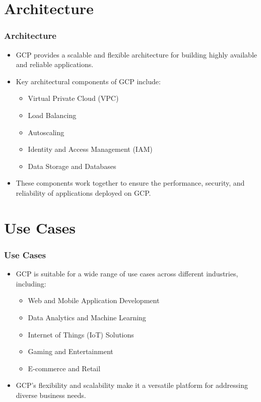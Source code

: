 \section{Architecture}

\begin{frame}[fragile]\frametitle{Architecture}
  \begin{itemize}
    \item GCP provides a scalable and flexible architecture for building highly available and reliable applications.
    \item Key architectural components of GCP include:
      \begin{itemize}
        \item Virtual Private Cloud (VPC)
        \item Load Balancing
        \item Autoscaling
        \item Identity and Access Management (IAM)
        \item Data Storage and Databases
      \end{itemize}
    \item These components work together to ensure the performance, security, and reliability of applications deployed on GCP.
  \end{itemize}
\end{frame}

\section{Use Cases}

\begin{frame}[fragile]\frametitle{Use Cases}
  \begin{itemize}
    \item GCP is suitable for a wide range of use cases across different industries, including:
      \begin{itemize}
        \item Web and Mobile Application Development
        \item Data Analytics and Machine Learning
        \item Internet of Things (IoT) Solutions
        \item Gaming and Entertainment
        \item E-commerce and Retail
      \end{itemize}
    \item GCP's flexibility and scalability make it a versatile platform for addressing diverse business needs.
  \end{itemize}
\end{frame}

